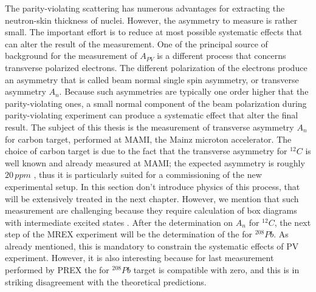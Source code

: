 The parity-violating scattering has numerous advantages for extracting the neutron-skin thickness of nuclei. However, the asymmetry to measure is rather small. The important effort is to reduce at most possible systematic effects that can alter the result of the measurement. One of the principal source of background for the measurement of $A_{PV}$ is a different process that concerns transverse polarized electrons. The different polarization of the electrons produce an asymmetry that is called beam normal single spin asymmetry, or transverse asymmetry $A_{n}$. Because such asymmetries are typically one order higher that the parity-violating ones, a small normal component of the beam polarization during parity-violating experiment can produce a systematic effect that alter the final result. The subject of this thesis is the measurement of transverse asymmetry $A_{n}$ for carbon target, performed at MAMI, the Mainz microton accelerator. The choice of carbon target is due to the fact that the transverse asymmetry for $^{12}C$ is well known and already measured at MAMI; the expected asymmetry is roughly $20 \, ppm$ , thus it is particularly suited for a commissioning of the new experimental setup. In this section don't introduce physics of this process, that will be extensively treated in the next chapter. However, we mention that such measurement are challenging because they require calculation of box diagrams with intermediate excited states \cite{Gorchtein_2008}.
After the determination on $A_{n}$ for $^{12}C$, the next step of the MREX experiment will be the determination of the \transv for $^{208}Pb$. As already mentioned, this is mandatory to constrain the systematic effects of PV experiment. However, it is also interesting because for last measurement performed by PREX \cite{HAPPEX:2012fud} the \transv for $^{208}Pb$ target is compatible with zero, and this is in striking disagreement with the theoretical predictions. 
